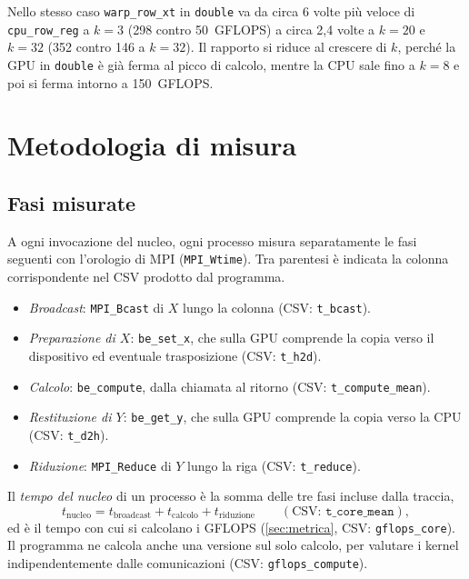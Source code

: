 \documentclass[11pt,a4paper]{article}
\begin{document}
Nello stesso caso \texttt{warp\_row\_xt} in \texttt{double} va da circa 6 volte
più veloce di \texttt{cpu\_row\_reg} a $k = 3$ (298 contro 50~GFLOPS) a circa
2,4 volte a $k = 20$ e $k = 32$ (352 contro 146 a $k = 32$). Il rapporto si
riduce al crescere di $k$, perché la GPU in \texttt{double} è già ferma al picco
di calcolo, mentre la CPU sale fino a $k = 8$ e poi si ferma intorno a
150~GFLOPS.

\section{Metodologia di misura}\label{sec:misure}

\subsection{Fasi misurate}\label{sec:fasi}

A ogni invocazione del nucleo, ogni processo misura separatamente le fasi
seguenti con l'orologio di MPI (\texttt{MPI\_Wtime}). Tra parentesi è
indicata la colonna corrispondente nel CSV prodotto dal programma.
\begin{itemize}
  \item \emph{Broadcast}: \texttt{MPI\_Bcast} di $X$ lungo la colonna (CSV:
        \texttt{t\_bcast}).
  \item \emph{Preparazione di $X$}: \texttt{be\_set\_x}, che sulla GPU comprende la copia verso
        il dispositivo ed eventuale trasposizione (CSV: \texttt{t\_h2d}).
  \item \emph{Calcolo}: \texttt{be\_compute}, dalla chiamata al ritorno (CSV:
        \texttt{t\_compute\_mean}).
  \item \emph{Restituzione di $Y$}: \texttt{be\_get\_y}, che sulla GPU comprende la copia verso
        la CPU (CSV: \texttt{t\_d2h}).
  \item \emph{Riduzione}: \texttt{MPI\_Reduce} di $Y$ lungo la riga (CSV:
        \texttt{t\_reduce}).
\end{itemize}

Il \emph{tempo del nucleo} di un processo è la somma delle tre fasi incluse
dalla traccia,
\[
  t_{\text{nucleo}} = t_{\text{broadcast}} + t_{\text{calcolo}} + t_{\text{riduzione}}
  \qquad (\text{CSV: } \texttt{t\_core\_mean}),
\]
ed è il tempo con cui si calcolano i GFLOPS (\cref{sec:metrica}, CSV:
\texttt{gflops\_core}). Il programma ne calcola anche una versione sul solo
calcolo, per valutare i kernel indipendentemente dalle comunicazioni (CSV:
\texttt{gflops\_compute}).
\end{document}
